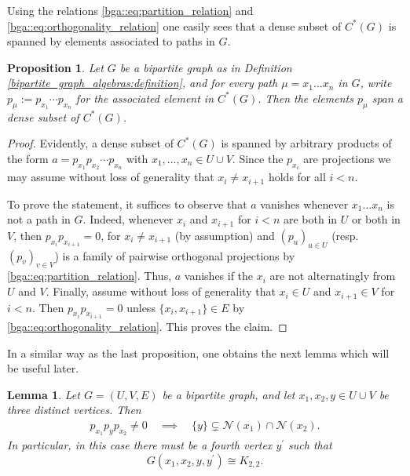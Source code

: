 \documentclass[a4paper]{amsart}
\newtheorem{lemma}[thm]{Lemma}
\newtheorem{proposition}[thm]{Proposition}
\begin{document}
Using the relations \eqref{bga::eq:partition_relation} and \eqref{bga::eq:orthogonality_relation} one easily sees that a dense subset of $C^\ast(G)$ is spanned by elements associated to paths in $G$.

\begin{proposition} 
    \label{prop::bipartite_graph_algebras:definition:dense_subset}
    Let $G$ be a bipartite graph as in Definition \ref{bipartite_graph_algebras:definition}, and for every path $\mu = x_1 \dots x_n$ in $G$, write $p_\mu := p_{x_1} \cdots p_{x_n}$ for the associated element in $C^\ast(G)$. Then the elements $p_\mu$ span a dense subset of $C^\ast(G)$. %
\end{proposition}

\begin{proof}
    Evidently, a dense subset of $C^\ast(G)$ is spanned by arbitrary products of the form $a = p_{x_1} p_{x_2} \cdots p_{x_n}$ with $x_1, \dots, x_n \in U \cup V$. Since the $p_{x_i}$ are projections we may assume without loss of generality that $x_i \neq x_{i+1}$ holds for all $i < n$. 
    
    To prove the statement, it suffices to observe that $a$ vanishes whenever $x_1 \dots x_n$ is not a path in $G$. Indeed, whenever $x_i$ and $x_{i+1}$ for $i < n$ are both in $U$ or both in $V$, then $p_{x_i} p_{x_{i+1}} = 0$, for $x_i \neq x_{i+1}$ (by assumption) and $(p_u)_{u \in U}$ (resp. $(p_v)_{v \in V}$) is a family of pairwise orthogonal projections by \eqref{bga::eq:partition_relation}. Thus, $a$ vanishes if the $x_i$ are not alternatingly from $U$ and $V$. Finally, assume without loss of generality that $x_i \in U$ and $x_{i+1} \in V$ for $i < n$. Then $p_{x_i} p_{x_{i+1}} = 0$ unless $\{x_i, x_{i+1}\} \in E$ by \eqref{bga::eq:orthogonality_relation}. This proves the claim.
\end{proof}

In a similar way as the last proposition, one obtains the next lemma which will be useful later.

\begin{lemma}
    \label{bga::lemma:nontrivial_p_x2 p_y p_x2_and_K22_subgraph}
    Let $G = (U, V, E)$ be a bipartite graph, and let $x_1, x_2, y \in U \cup V$ be three distinct vertices. Then 
    \begin{align*}
        p_{x_1} p_y p_{x_2} \neq 0
        \quad \implies \quad 
        \{y\} \subsetneq \mathcal{N}(x_1) \cap \mathcal{N}(x_2).
    \end{align*}
    In particular, in this case there must be a fourth vertex $y^\prime$ such that 
    $$
    G(x_1, x_2, y, y^\prime) \cong K_{2,2}.
    $$
\end{lemma}
\end{document}
